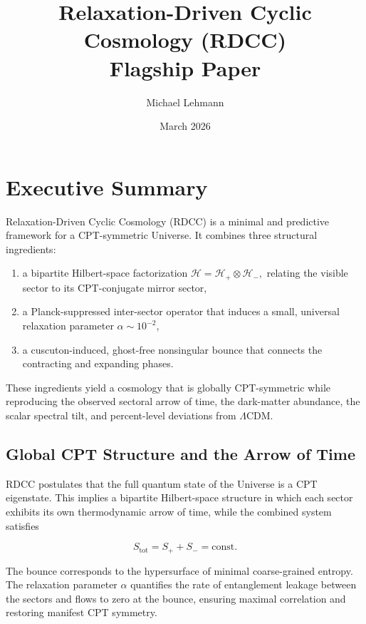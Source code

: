 \documentclass[11pt,a4paper]{article}
\title{\textbf{Relaxation-Driven Cyclic Cosmology (RDCC)}\\
\large Flagship Paper}
\author[1]{Michael Lehmann}
\affil[1]{\small Independent Researcher\\
\texttt{mi.lehmann@gmx.de}}
\date{March 2026}
\begin{document}
\maketitle
\thispagestyle{empty}

\section*{Executive Summary}

Relaxation-Driven Cyclic Cosmology (RDCC) is a minimal and predictive framework
for a CPT-symmetric Universe. It combines three structural ingredients:

\begin{enumerate}[label=\textbf{(\alph*)}]
    \item a bipartite Hilbert-space factorization 
    \(
        \mathcal{H} = \mathcal{H}_{+} \otimes \mathcal{H}_{-},
    \)
    relating the visible sector to its CPT-conjugate mirror sector,

    \item a Planck-suppressed inter-sector operator that induces a small,
    universal relaxation parameter \( \alpha \sim 10^{-2} \),

    \item a cuscuton-induced, ghost-free nonsingular bounce that connects
    the contracting and expanding phases.
\end{enumerate}

These ingredients yield a cosmology that is globally CPT-symmetric while
reproducing the observed sectoral arrow of time, the dark-matter abundance,
the scalar spectral tilt, and percent-level deviations from \(\Lambda\)CDM.

\subsection*{Global CPT Structure and the Arrow of Time}

RDCC postulates that the full quantum state of the Universe is a CPT eigenstate.
This implies a bipartite Hilbert-space structure in which each sector exhibits
its own thermodynamic arrow of time, while the combined system satisfies

\[
S_{\mathrm{tot}} = S_{+} + S_{-} = \mathrm{const}.
\]

The bounce corresponds to the hypersurface of minimal coarse-grained entropy.
The relaxation parameter \( \alpha \) quantifies the rate of entanglement leakage
between the sectors and flows to zero at the bounce, ensuring maximal correlation
and restoring manifest CPT symmetry.
\end{document}
